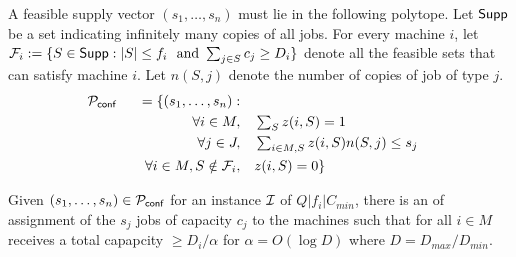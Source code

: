 \noindent
A feasible supply vector $(s_1,\ldots,s_n)$ must lie in the following polytope. Let $\mathsf{Supp}$ be a set indicating infinitely many copies of all jobs.
For every machine $i$, let ${\cal F}_i :=\{S\in \mathsf{Supp}: |S| \leq f_i ~\textrm{ and } \sum_{j\in S} c_j \geq D_i\}$ denote all the feasible sets that can satisfy machine $i$. 
Let $n(S,j)$ denote the number of copies of job of type $j$.
	\begin{alignat}{4}
		{\cal P}_\mathsf{conf} && = \{(s_1,\ldots,s_n):  && \notag \\
		&& \quad \forall i \in M,   &\quad  \textstyle \sum_{S} z(i,S)  =  1 \label{eq:conflp1} \\
		&& \quad \forall j\in J ,  &\quad  \textstyle \sum_{i\in M,S}  z(i,S)n(S,j) \le  s_j \label{eq:conflp2} \\
		&& \quad \forall i\in M, S\notin {\cal F}_i, & \quad z(i,S)  = 0 \label{eq:conflp3}  \}
	\end{alignat}
\def\z{\bar z}
\begin{theorem}\label{thm:conflprounding}
	Given $(s_1,\ldots,s_n) \in {\cal P}_\mathsf{conf}$ for an instance ${\cal I}$ of $Q|f_i|C_{min}$, there is an of assignment of the $s_j$ jobs of capacity $c_j$  to the machines such that for all $i\in M$
	receives a total capapcity $\geq D_i/\alpha$ for $\alpha = O(\log D)$ where $D = D_{max}/D_{min}$.
\end{theorem}
\def\calFr{\calF^{(\alpha,\beta)}}
